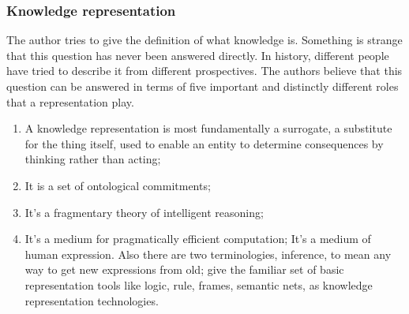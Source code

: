 \subsubsection{Knowledge representation}
The author tries to give the definition of what knowledge is. Something is strange that this question has never been answered directly. In history, different people have tried to describe it from different prospectives. The authors believe that this question can be answered in terms of five important and distinctly different roles that a representation play.
\begin{enumerate}
	\item A knowledge representation is most fundamentally a surrogate, a substitute for the thing itself, used to enable an entity to determine consequences by thinking rather than acting;
	\item It is a set of ontological commitments;
	\item It's a fragmentary theory of intelligent reasoning;
	\item It's a medium for pragmatically efficient computation;
	\itme It's a medium of human expression.
Also there are two terminologies, inference, to mean any way to get new expressions from old; give the familiar set of basic representation tools like logic, rule, frames, semantic nets, as knowledge representation technologies.
\end{enumerate}